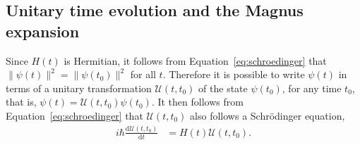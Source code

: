 \documentclass{jors}
\begin{document}


	
	\subsection{Unitary time evolution and the Magnus expansion}
		Since $H(t)$ is Hermitian, it follows from Equation~\eqref{eq:schroedinger} that $\|\psi(t)\|^2 = \|\psi(t_0)\|^2$ for all $t$.
		Therefore it is possible to write $ \psi(t) $ in terms of a unitary transformation $ \mathcal{U}(t, t_0) $ of the state $ \psi(t_0) $, for any time $ t_0 $, that is, $ \psi(t) = \mathcal{U}(t, t_0)\psi(t_0) $.
		It then follows from Equation~\eqref{eq:schroedinger} that $ \mathcal{U}(t, t_0) $ also follows a Schr\"{o}dinger equation,
		\begin{align}
			i\hbar\frac{\mathrm{d}\mathcal{U}(t, t_0)}{\mathrm{d}t} &= H(t)\mathcal{U}(t, t_0).\label{eq:unitary_schroedinger}
		\end{align}
\end{document}
